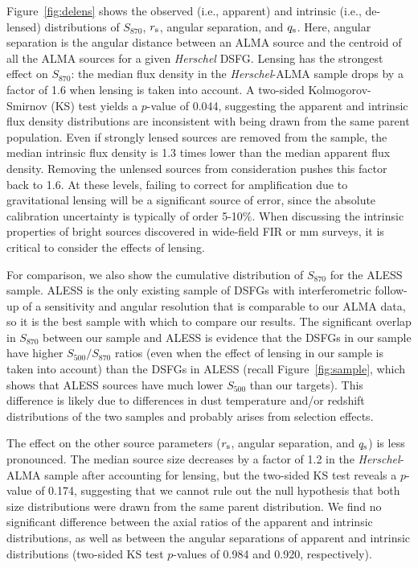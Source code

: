 \documentclass[iop]{emulateapj}
\begin{document}
Figure~\ref{fig:delens} shows the observed (i.e., apparent) and intrinsic
(i.e., de-lensed) distributions of $S_{870}$, $r_{\rm s}$, angular separation,
and $q_{\rm s}$.  Here, angular separation is the angular distance between an
ALMA source and the centroid of all the ALMA sources for a given {\it Herschel}
DSFG.  Lensing has the strongest effect on $S_{870}$: the median flux density
in the {\it Herschel}-ALMA sample drops by a factor of 1.6 when lensing is
taken into account. A two-sided Kolmogorov-Smirnov (KS) test yields a $p$-value
of 0.044, suggesting the apparent and intrinsic flux density distributions are
inconsistent with being drawn from the same parent population.  Even if
strongly lensed sources are removed from the sample, the median intrinsic flux
density is 1.3 times lower than the median apparent flux density.  Removing the
unlensed sources from consideration pushes this factor back to 1.6.  At these
levels, failing to correct for amplification due to gravitational lensing will
be a significant source of error, since the absolute calibration uncertainty is
typically of order 5-10\%.  When discussing the intrinsic properties of bright
sources \citep[including their number counts, e.g.][]{Wyithe:2011rm}
discovered in wide-field FIR or mm surveys, it is critical to consider the
effects of lensing.

For comparison, we also show the cumulative distribution of $S_{870}$ for the
ALESS sample.  ALESS is the only existing sample of DSFGs with interferometric
follow-up of a sensitivity and angular resolution that is comparable to our
ALMA data, so it is the best sample with which to compare our results.  The
significant overlap in $S_{870}$ between our sample and ALESS is evidence that
the DSFGs in our sample have higher $S_{500}/S_{870}$ ratios (even when the
effect of lensing in our sample is taken into account) than the DSFGs in ALESS
(recall Figure~\ref{fig:sample}, which shows that ALESS sources have much lower
$S_{500}$ than our targets).  This difference is likely due to differences in
dust temperature and/or redshift distributions of the two samples and probably
arises from selection effects.

The effect on the other source parameters ($r_{\rm s}$, angular separation, and
$q_{\rm s}$) is less pronounced.  The median source size decreases by a factor
of 1.2 in the {\it Herschel}-ALMA sample after accounting for lensing, but the
two-sided KS test reveals a $p$-value of 0.174, suggesting that we cannot rule
out the null hypothesis that both size distributions were drawn from the same
parent distribution.  We find no significant difference between the axial
ratios of the apparent and intrinsic distributions, as well as between the
angular separations of apparent and intrinsic distributions (two-sided KS test
$p$-values of 0.984 and 0.920, respectively). 
\end{document}
